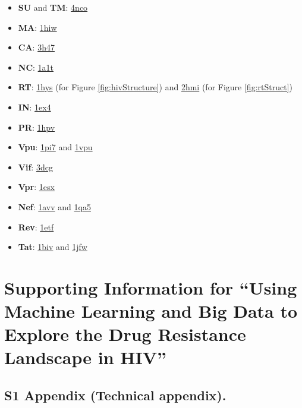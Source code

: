 \documentclass[
  11pt,
  twoside]{scrbook}
\begin{document}
\begin{itemize}
\item
  \textbf{SU} and \textbf{TM}: \href{http://www.rcsb.org/pdb/explore.do?structureId=4nco}{4nco}
\item
  \textbf{MA}: \href{http://rcsb.org/pdb/explore/explore.do?structureId=1hiw}{1hiw}
\item
  \textbf{CA}: \href{http://rcsb.org/pdb/explore/explore.do?structureId=3h47}{3h47}
\item
  \textbf{NC}: \href{http://rcsb.org/pdb/explore/explore.do?structureId=1a1t}{1a1t}
\item
  \textbf{RT}: \href{http://www.rcsb.org/pdb/explore.do?structureId=1hys}{1hys} (for Figure \ref{fig:hivStructure}) and \href{http://www.rcsb.org/pdb/explore.do?structureId=2hmi}{2hmi} (for Figure \ref{fig:rtStruct})
\item
  \textbf{IN}: \href{http://www.rcsb.org/pdb/explore.do?structureId=1ex4}{1ex4}
\item
  \textbf{PR}: \href{http://www.rcsb.org/pdb/explore.do?structureId=1hpv}{1hpv}
\item
  \textbf{Vpu}: \href{http://www.rcsb.org/pdb/explore.do?structureId=1pi7}{1pi7} and \href{http://www.rcsb.org/pdb/explore.do?structureId=1vpu}{1vpu}
\item
  \textbf{Vif}: \href{http://www.rcsb.org/pdb/explore.do?structureId=3dcg}{3dcg}
\item
  \textbf{Vpr}: \href{http://www.rcsb.org/pdb/explore.do?structureId=1esx}{1esx}
\item
  \textbf{Nef}: \href{http://www.rcsb.org/pdb/explore.do?structureId=1avv}{1avv} and \href{http://www.rcsb.org/pdb/explore.do?structureId=1qa5}{1qa5}
\item
  \textbf{Rev}: \href{http://www.rcsb.org/pdb/explore.do?structureId=1etf}{1etf}
\item
  \textbf{Tat}: \href{http://www.rcsb.org/pdb/explore.do?structureId=1biv}{1biv} and \href{http://www.rcsb.org/pdb/explore.do?structureId=1jfw}{1jfw}
\end{itemize}

\hypertarget{HIV-appendix}{%
\chapter{Supporting Information for ``Using Machine Learning and Big Data to Explore the Drug Resistance Landscape in HIV''}\label{HIV-appendix}}

\hypertarget{S1-Appendix}{%
\section{S1 Appendix (Technical appendix).}\label{S1-Appendix}}
\end{document}
